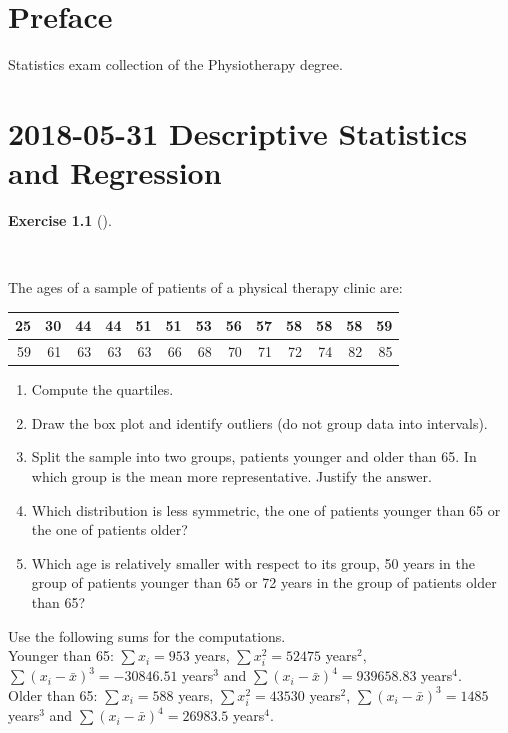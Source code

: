 \documentclass[
  a4paper,
]{scrreport}
\theoremstyle{definition}
\newtheorem{exercise}{Exercise}[chapter]
\theoremstyle{remark}
\begin{document}
\hypertarget{preface}{%
\chapter*{Preface}\label{preface}}


Statistics exam collection of the Physiotherapy degree.


\hypertarget{descriptive-statistics-and-regression}{%
\chapter{\texorpdfstring{2018-05-31 Descriptive Statistics and
Regression}{2018-05-31  Descriptive Statistics and Regression}}\label{descriptive-statistics-and-regression}}

\begin{exercise}[]\protect\hypertarget{exr-1}{}\label{exr-1}

~

The ages of a sample of patients of a physical therapy clinic are:

\begin{table}
\centering
\begin{tabular}{r|r|r|r|r|r|r|r|r|r|r|r|r}
\hline
25 & 30 & 44 & 44 & 51 & 51 & 53 & 56 & 57 & 58 & 58 & 58 & 59\\
\hline
59 & 61 & 63 & 63 & 63 & 66 & 68 & 70 & 71 & 72 & 74 & 82 & 85\\
\hline
\end{tabular}
\end{table}

\begin{enumerate}
\def\labelenumi{\alph{enumi}.}
\item
  Compute the quartiles.
\item
  Draw the box plot and identify outliers (do not group data into
  intervals).
\item
  Split the sample into two groups, patients younger and older than 65.
  In which group is the mean more representative. Justify the answer.
\item
  Which distribution is less symmetric, the one of patients younger than
  65 or the one of patients older?
\item
  Which age is relatively smaller with respect to its group, 50 years in
  the group of patients younger than 65 or 72 years in the group of
  patients older than 65?
\end{enumerate}

Use the following sums for the computations.\\
Younger than 65: \(\sum x_i=953\) years, \(\sum x_i^2=52475\)
years\(^2\), \(\sum (x_i-\bar x)^3=-30846.51\) years\(^3\) and
\(\sum (x_i-\bar x)^4=939658.83\) years\(^4\).\\
Older than 65: \(\sum x_i=588\) years, \(\sum x_i^2=43530\) years\(^2\),
\(\sum (x_i-\bar x)^3=1485\) years\(^3\) and
\(\sum (x_i-\bar x)^4=26983.5\) years\(^4\).

\end{exercise}
\end{document}
